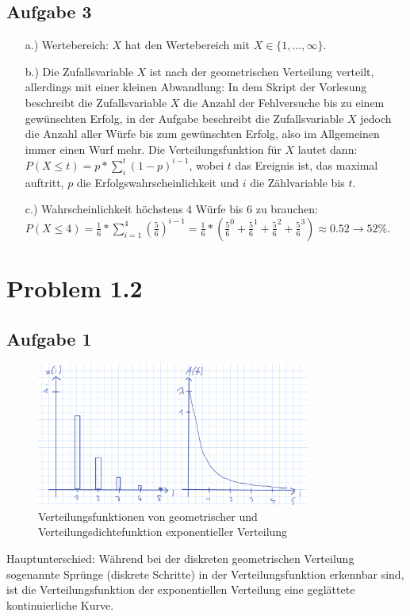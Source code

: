 \documentclass[%
10pt,              %
ngerman,           %
a4paper,           %
DIV11,             %
]{scrartcl}%
\begin{document}
\subsection*{Aufgabe 3}

\begin{itemize}
	\item[a.)] Wertebereich: $X$ hat den Wertebereich mit $X \in \{1, \dots, \infty \}$.
	\item[b.)] Die Zufallsvariable $X$ ist nach der geometrischen Verteilung verteilt, allerdings mit einer kleinen Abwandlung: In dem Skript der Vorlesung beschreibt die Zufallsvariable $X$ die Anzahl der Fehlversuche bis zu einem gewünschten Erfolg, in der Aufgabe beschreibt die Zufallsvariable $X$ jedoch die Anzahl aller Würfe bis zum gewünschten Erfolg, also im Allgemeinen immer einen Wurf mehr. Die Verteilungsfunktion für $X$ lautet dann: $P(X \leq t) = p * \sum_{i}^{t} (1-p)^{i-1}$, wobei $t$ das Ereignis ist, das maximal auftritt, $p$ die Erfolgswahrscheinlichkeit und $i$ die Zählvariable bis $t$. 
	\item[c.)] Wahrscheinlichkeit höchstens 4 Würfe bis 6 zu brauchen:\newline
	$P(X \leq 4) = \frac{1}{6} * \sum_{i = 1}^{4} (\frac{5}{6})^{i-1} = \frac{1}{6} * ( \frac{5}{6}^0 + \frac{5}{6}^1 + \frac{5}{6}^2 + \frac{5}{6}^3) \approx 0.52 \rightarrow 52\%$.
\end{itemize}

\section*{Problem 1.2}

\subsection*{Aufgabe 1}

\begin{figure}[!htbp]
  \centering
    \caption{Verteilungsfunktionen von geometrischer und Verteilungsdichtefunktion exponentieller Verteilung}
    \includegraphics[width=0.8\textwidth]{a4vert}
\end{figure}
Hauptunterschied: Während bei der diskreten geometrischen Verteilung sogenannte Sprünge (diskrete Schritte) in der Verteilungsfunktion erkennbar sind, ist die Verteilungsfunktion der exponentiellen Verteilung eine geglättete kontinuierliche Kurve. 
\newpage
\end{document}
